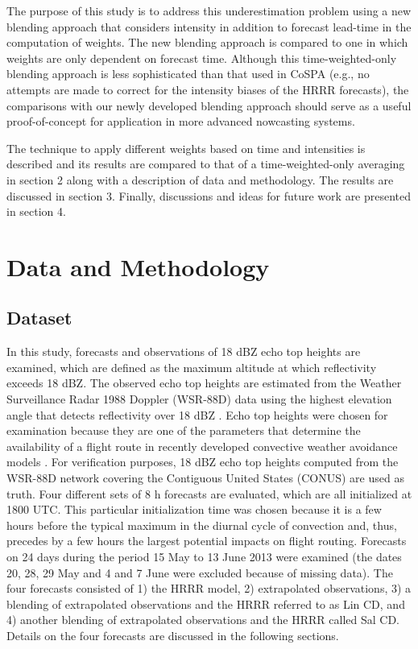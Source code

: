 \documentclass[12pt]{article}
\begin{document}
 The purpose of this study is to address this underestimation problem using a new blending approach that considers intensity in addition to forecast lead-time in the computation of weights. The new blending approach is compared to one in which weights are only dependent on forecast time. Although this time-weighted-only blending approach is less sophisticated than that used in CoSPA (e.g., no attempts are made to correct for the intensity biases of the HRRR forecasts), the comparisons with our newly developed blending approach should serve as a useful proof-of-concept for application in more advanced nowcasting systems.

The technique to apply different weights based on time and intensities is described and its results are compared to that of a time-weighted-only averaging in section 2 along with a description of data and methodology. The results are discussed in section 3. Finally, discussions and ideas for future work are presented in section 4.
 
\section{Data and Methodology}
\subsection{Dataset}
In this study, forecasts and observations of 18 dBZ echo top heights are examined, which are defined as the maximum altitude at which reflectivity exceeds 18 dBZ. The observed echo top heights are estimated from the Weather Surveillance Radar 1988 Doppler (WSR-88D) data using the highest elevation angle that detects reflectivity over 18 dBZ \citep{lak++13}. Echo top heights were chosen for examination because they  are one of the parameters that determine the availability of a flight route in recently developed convective weather avoidance models \citep{mat+10, sheth++13}. For verification purposes, 18 dBZ echo top heights computed from the WSR-88D network covering the Contiguous United States (CONUS) are used as truth. Four different sets of 8 h forecasts are evaluated, which are all initialized at 1800 UTC. This particular initialization time was chosen because it is a few hours before the typical maximum in the diurnal cycle of convection and, thus, precedes by a few hours the largest potential impacts on flight routing. Forecasts on 24 days during the period 15 May to 13 June 2013 were examined (the dates 20, 28, 29 May and 4 and 7 June were excluded because of missing data). The four forecasts consisted of 1) the HRRR model, 2) extrapolated observations, 3) a blending of extrapolated observations and the HRRR referred to as Lin CD, and 4) another blending of extrapolated observations and the HRRR called Sal CD. Details on the four forecasts are discussed in the following sections. 
\end{document}
